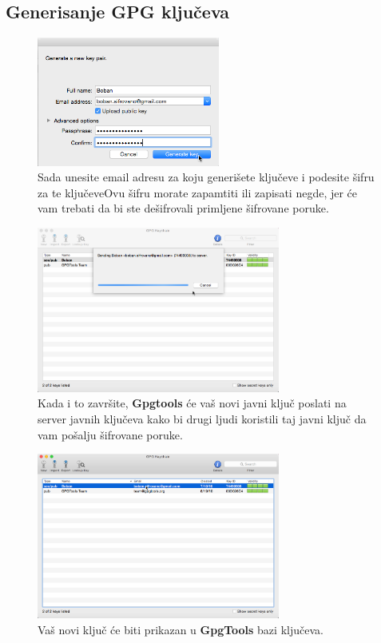 \documentclass[a4paper,11pt]{article}
\begin{document}
\subsection{Generisanje GPG klju\v{c}eva}
\begin{figure}[!h]
	\begin{center}
		\includegraphics[width=6cm]{08_Oracle_VM_VirtualBox.png}
		\caption{Sada unesite email adresu za koju generi\v{s}ete klju\v{c}eve i podesite \v{s}ifru za te klju\v{c}eve\newline Ovu \v{s}ifru morate zapamtiti ili zapisati negde, jer \'{c}e vam trebati da bi ste de\v{s}ifrovali primljene \v{s}ifrovane poruke.}
		\label{gpgtools_keygen1}
	\end{center}
\end{figure}
\begin{figure}[!h]
	\begin{center}
		\includegraphics[width=8cm]{09_Oracle_VM_VirtualBox.png}
		\caption{Kada i to zavr\v{s}ite, \textbf{Gpgtools} \'{c}e va\v{s} novi javni klju\v{c} poslati na server javnih klju\v{c}eva kako bi drugi ljudi koristili taj javni klju\v{c} da vam po\v{s}alju \v{s}ifrovane poruke.}
		\label{gpgtools_keygen2}
	\end{center}
\end{figure}
\newpage
\begin{figure}[!h]
	\begin{center}
		\includegraphics[width=8cm]{10_Oracle_VM_VirtualBox.png}
		\caption{Va\v{s} novi klju\v{c} \'{c}e biti prikazan u \textbf{GpgTools} bazi klju\v{c}eva. }
		\label{gpgtools_keygen3}
	\end{center}
\end{figure}
\end{document}
